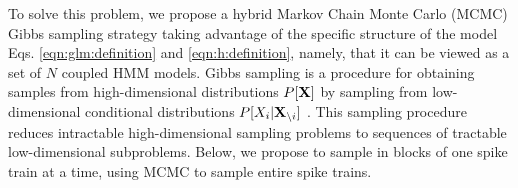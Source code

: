 %
%

To solve this problem, we propose a hybrid Markov Chain Monte Carlo (MCMC) Gibbs sampling strategy taking advantage of the specific structure of the model Eqs. \eqref{eqn:glm:definition} and \eqref{eqn:h:definition}, namely, that it can be viewed as a set of $N$ coupled HMM models. Gibbs sampling is a procedure for obtaining samples from high-dimensional distributions $P[{\bf X}]$ by sampling from low-dimensional conditional distributions $P[X_{i}|{\bf X}_{\backslash i}]$  \cite{Gelfand1990}.  This sampling procedure reduces intractable high-dimensional sampling problems to sequences of tractable low-dimensional subproblems.  Below, we propose to sample in blocks of one spike train at a time, using MCMC to sample entire spike trains.


